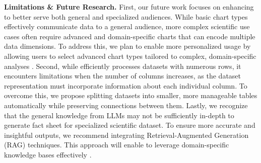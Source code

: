 \textbf{Limitations \& Future Research.}
First, our future work focuses on enhancing \tool to better serve both general and specialized audiences. While basic chart types effectively communicate data to a general audience, more complex scientific use cases often require advanced and domain-specific charts that can encode multiple data dimensions. To address this, we plan to enable more personalized usage by allowing users to select advanced chart types tailored to complex, domain-specific analyses \cite{dibia2018data2vis}. Second, while \tool efficiently processes datasets with numerous rows, it encounters limitations when the number of columns increases, as the dataset representation must incorporate information about each individual column. To overcome this, we propose splitting datasets into smaller, more manageable tables automatically while preserving connections between them.
Lastly, we recognize that the general knowledge from LLMs may not be sufficiently in-depth to generate fact sheet for specialized scientific dataset. To ensure more accurate and insightful outputs, we recommend integrating Retrieval-Augmented Generation (RAG) techniques. This approach will enable \tool to leverage domain-specific knowledge bases effectively \cite{dibia2018data2vis}.


